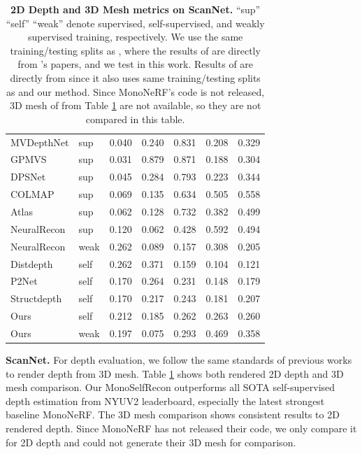 \begin{table}[]
\begin{tabular}{lllllll}
MVDepthNet\cite{mvdepthnet}     & sup        & 0.040 & 0.240 & 0.831  & 0.208 & 0.329   \\
GPMVS\cite{gpmvs}          & sup         & 0.031 & 0.879 & 0.871  & 0.188 & 0.304   \\
DPSNet\cite{dpsnet}         & sup         & 0.045 & 0.284 & 0.793  & 0.223 & 0.344   \\
COLMAP\cite{colmap}         & sup         & 0.069 & 0.135 & 0.634  & 0.505 & 0.558   \\
Atlas\cite{atlas}          & sup         & 0.062 & 0.128 & 0.732  & 0.382 & 0.499   \\
NeuralRecon\cite{neucon}    & sup         & 0.120 & 0.062 & 0.428  & 0.592 & 0.494   \\
NeuralRecon\cite{neucon}    & weak         & 0.262 & 0.089 & 0.157  & 0.308 & 0.205   \\
\hline
Distdepth\cite{distdepth}   & self   & 0.262 & 0.371 & 0.159  & 0.104 & 0.121    \\ 
P2Net\cite{p2net}   & self  & 0.170 & 0.264 & 0.231  & 0.148 & 0.179    \\ 
Structdepth\cite{structdepth}   & self      & 0.170 & 0.217 & 0.243  & 0.181 & 0.207    \\ 
Ours   & self                   & 0.212 & 0.185 & 0.262  & 0.263 & 0.260    \\ 
Ours   & weak                   & 0.197 & 0.075 & 0.293  & 0.469 & 0.358    \\ \hline
\end{tabular}
\vspace{-3mm}
\caption{\textbf{2D Depth and 3D Mesh metrics on ScanNet.} ``sup'' ``self'' ``weak'' denote supervised, self-supervised, and weakly supervised training, respectively. We use the same training/testing splits as \cite{atlas, neucon}, where the results of \cite{mvdepthnet,gpmvs,dpsnet,colmap} are directly from \cite{atlas, neucon}'s papers, and we test \cite{distdepth,p2net,structdepth} in this work. Results of \cite{monodepth2, mononerf} are directly from \cite{mononerf} since it also uses same training/testing splits as \cite{atlas,neucon} and our method. Since MonoNeRF\cite{mononerf}'s code is not released, 3D mesh of \cite{mononerf,monodepth2} from Table \ref{table:scannet} are not available, so they are not compared in this table.
}
\label{table:scannet}
\vspace{-7mm}
\end{table}


\noindent
\textbf{ScanNet.} For depth evaluation, we follow the same standards of previous works \cite{atlas, neucon} to render depth from 3D mesh. Table \ref{table:scannet} shows both rendered 2D depth and 3D mesh comparison. Our MonoSelfRecon outperforms all SOTA self-supervised depth estimation from NYUV2 leaderboard, especially the latest strongest baseline MonoNeRF. The 3D mesh comparison shows consistent results to 2D rendered depth. Since MonoNeRF has not released their code, we only compare it for 2D depth and could not generate their 3D mesh for comparison. 

